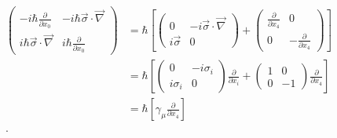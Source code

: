 \documentclass{report}
\begin{document}
\begin{align*}
	\begin{pmatrix}
		-i \hbar \frac{ \partial  }{ \partial x_0 } & - i \hbar \vec{\sigma} \cdot \vec{\nabla}  \\
		i \hbar \vec{\sigma} \cdot \vec{\nabla}     & i \hbar \frac{ \partial  }{ \partial x_0 }
	\end{pmatrix}
	 & = \hbar \left[ \begin{pmatrix}
			                  0              & -i \vec{\sigma} \cdot \vec{\nabla} \\
			                  i \vec{\sigma} & 0
		                  \end{pmatrix} + \begin{pmatrix} \frac{ \partial }{ \partial x_4 } & 0 \\ 0 & - \frac{ \partial }{ \partial x_4 }   \end{pmatrix}  \right]                                                              \\
	 & = \hbar \left[ \begin{pmatrix} 0 & -i \sigma_{i} \\ i \sigma_{i} & 0 \end{pmatrix} \frac{ \partial }{ \partial x_{i} } + \begin{pmatrix} 1 & 0 \\ 0 & -1 \end{pmatrix} \frac{ \partial  }{ \partial x_4 }     \right] \\
	 & = \hbar \left[ \gamma_{\mu} \frac{ \partial }{ \partial x_4 }  \right]
	\\
	\\
	.\end{align*}
\\
\\
\end{document}
